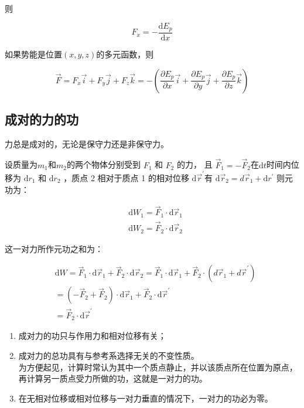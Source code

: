 \documentclass[
	12pt, %
	a4paper, %
]{myLegrandOrangeBook}
\newcommand{\rmd}{\mathrm{d}}
\begin{document}
则

\begin{equation}
    F_x=-\frac{\rmd E_p}{\rmd x}
\end{equation}

如果势能是位置\(\left(x,y,z\right)\)的多元函数，则

\begin{equation}
    \overrightarrow{F}=F_x \overrightarrow{i}+F_y \overrightarrow{j}+F_z \overrightarrow{k}=
    -\left(\frac{\partial E_p}{\partial x} \overrightarrow{i}+\frac{\partial E_p}{\partial y} \overrightarrow{j}+\frac{\partial E_p}{\partial z} \overrightarrow{k}\right)
\end{equation}

\subsection{成对的力的功}

力总是成对的，无论是保守力还是非保守力。

设质量为$m_1$和$m_2$的两个物体分别受到 $F_1$ 和 $F_2$ 的力，
且 $\overrightarrow{F}_1=-\overrightarrow{F}_2$在$\rmd t$时间内位移为 $\rmd r_1$
和 $\rmd r_2$ ，质点 2 相对于质点 1 的相对位移 $\rmd \overrightarrow{r}^{\prime}$有
$\rmd \overrightarrow{r}_2=d \overrightarrow{r}_1+\rmd r^{\prime}$ 则元功为：

$$
    \begin{aligned}
    & \rmd W_1=\overrightarrow{F}_1 \cdot \rmd \overrightarrow{r}_1 \\
    & \rmd W_2=\overrightarrow{F}_2 \cdot \rmd \overrightarrow{r}_2
    \end{aligned}
$$

这一对力所作元功之和为：

$$
\begin{aligned}
    & \rmd W=\overrightarrow{F}_1 \cdot \rmd \overrightarrow{r}_1+\overrightarrow{F}_2 \cdot \rmd \overrightarrow{r}_2=\overrightarrow{F}_1 \cdot\rmd\overrightarrow{r}_1+\overrightarrow{F}_2 \cdot\left(d \overrightarrow{r}_1+d \overrightarrow{r}^{\prime}\right) \\
    & =\left(-\overrightarrow{F}_2+\overrightarrow{F}_2\right) \cdot\rmd\overrightarrow{r}_1+\overrightarrow{F}_2 \cdot\rmd\overrightarrow{r}^{\prime} \quad \\
    & =\overrightarrow{F}_2 \cdot\rmd\overrightarrow{r}^{\prime}
\end{aligned}
$$

\begin{enumerate}
    \item 成对力的功只与作用力和相对位移有关；
    \item 成对力的总功具有与参考系选择无关的不变性质。\\
        为方便起见，计算时常认为其中一个质点静止，并以该质点所在位置为原点，
        再计算另一质点受力所做的功，这就是一对力的功。
    \item 在无相对位移或相对位移与一对力垂直的情况下，一对力的功必为零。
\end{enumerate}
\end{document}
